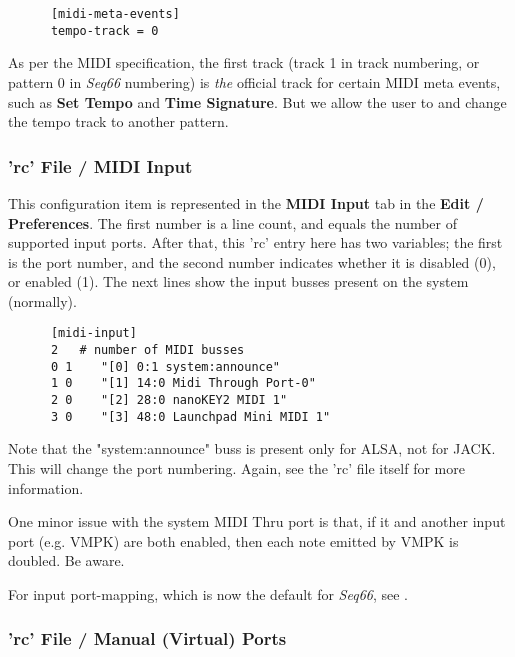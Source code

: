    \begin{verbatim}
      [midi-meta-events]
      tempo-track = 0
   \end{verbatim}

   As per the MIDI specification, the first track (track 1 in track
   numbering, or pattern 0 in \textsl{Seq66} numbering) is \textsl{the}
   official track for certain MIDI meta events, such as
   \textbf{Set Tempo} and
   \textbf{Time Signature}.
   But we allow the user to and change the tempo track to another pattern.

\subsubsection{'rc' File / MIDI Input}
\label{subsubsec:configuration_rc_midi_input}

   This configuration item is represented in the
   \textbf{MIDI Input} tab in the \textbf{Edit / Preferences}.
   The first number is a line count, and equals the number of
   supported input ports.
   After that, this 'rc' entry here has two variables;
   the first is the port number,
   and the second number indicates whether it is disabled (0), or enabled (1).
   The next lines show the input busses present on the system (normally).

   \begin{verbatim}
      [midi-input]
      2   # number of MIDI busses
      0 1    "[0] 0:1 system:announce"
      1 0    "[1] 14:0 Midi Through Port-0"
      2 0    "[2] 28:0 nanoKEY2 MIDI 1"
      3 0    "[3] 48:0 Launchpad Mini MIDI 1"
   \end{verbatim}

   Note that the "system:announce" buss is present only for ALSA, not for JACK.
   This will change the port numbering.
   Again, see the 'rc' file itself for more information.

   One minor issue with the system MIDI Thru port is that, if it and another
   input port (e.g. VMPK) are both enabled, then each note emitted by VMPK is
   doubled. Be aware.

   For input port-mapping, which is now the default for \textsl{Seq66},
   see .

\subsubsection{'rc' File / Manual (Virtual) Ports}
\label{subsubsec:configuration_rc_manual_ports}

